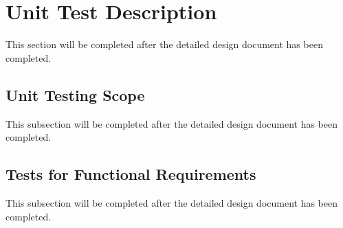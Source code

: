 \documentclass[12pt, titlepage]{article}
\begin{document}
\section{Unit Test Description}

This section will be completed after the detailed design document has been completed.




\subsection{Unit Testing Scope}

This subsection will be completed after the detailed design document has been completed.

\subsection{Tests for Functional Requirements}

This subsection will be completed after the detailed design document has been completed.

\end{document}
